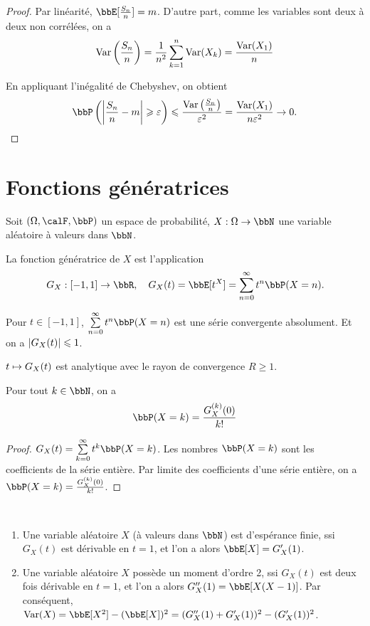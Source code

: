 \begin{proof}
    Par linéarité, $\bbE[\frac{S_n}{n}] = m$.
    D'autre part, comme les variables sont deux à deux non corrélées, on a
    \[ \operatorname{Var} \left(\frac{S_n}{n}\right) = \frac{1}{n^2} \sum_{k = 1}^n \operatorname{Var}(X_k) = \frac{\operatorname{Var}(X_1)}{n} \]

    En appliquant l'inégalité de Chebyshev, on obtient
    \[ \bbP \left(\lrvert{\frac{S_n}{n} - m} \geqslant \varepsilon\right) \leqslant \frac{\var \left(\frac{S_n}{n}\right)}{\varepsilon^2}
        = \frac{\var(X_1)}{n \varepsilon^2} \to 0. \]
\end{proof}

\section{Fonctions génératrices}

Soit $(\Omega, \calF, \bbP)$ un espace de probabilité,
$X: \Omega \to \bbN$ une variable aléatoire à valeurs dans $\bbN$.

\begin{deff}
    La fonction génératrice de $X$ est l'application
    \[ G_X: [-1, 1] \to \bbR, \quad G_X(t) = \bbE[t^X] = \sum_{n=0}^\infty t^n \bbP(X = n). \]
\end{deff}

\begin{rqq}
    Pour $t \in [-1, 1]$, $\sum\limits_{n = 0}^\infty t^n \bbP(X = n)$ est une série convergente absolument.
    Et on a $\left\lvert G_X(t) \right\rvert \leqslant 1$.
\end{rqq}

\begin{rqq}
    $t \mapsto G_X(t)$ est analytique avec le rayon de convergence $R \geqslant 1$.
\end{rqq}

\begin{prop}
    Pour tout $k \in \bbN$, on a
    \[ \bbP(X = k) = \frac{G_X^{(k)}(0)}{k!} \]
\end{prop}

\begin{proof}
    $G_X(t) = \sum\limits_{k = 0}^\infty t^k \bbP(X = k)$.
    Les nombres $\bbP(X = k)$ sont les coefficients de la série entière.
    Par limite des coefficients d'une série entière,
    on a $\bbP(X = k) = \frac{G_X^{(k)}(0)}{k!}$.
\end{proof}

\begin{prop} $\ $
    \begin{enumerate}
        \item Une variable aléatoire $X$ (à valeurs dans $\bbN$) est d'espérance finie,
              ssi $G_X(t)$ est dérivable en $t = 1$, et l'on a alors $\bbE[X] = G_X'(1)$.
        \item Une variable aléatoire $X$ possède un moment d'ordre 2,
              ssi $G_X(t)$ est deux fois dérivable en $t = 1$, et l'on a alors $G_X''(1) = \bbE[X(X - 1)]$.
              Par conséquent, $\var(X) = \bbE[X^2] - (\bbE[X])^2 = (G_X''(1) + G_X'(1))^2 - (G_X'(1))^2$.
    \end{enumerate}
\end{prop}

